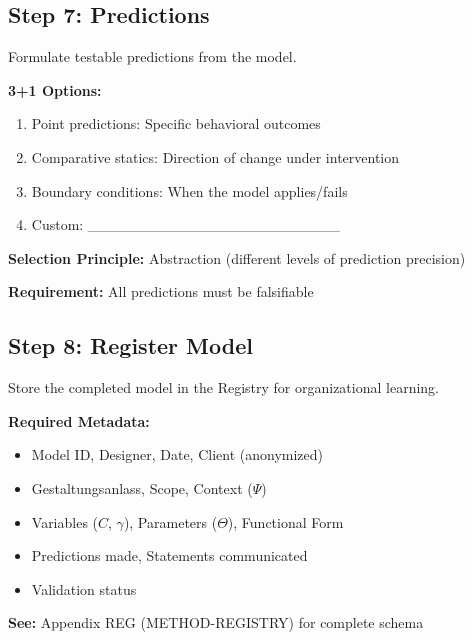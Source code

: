 \subsection{Step 7: Predictions}

Formulate testable predictions from the model.

\begin{tcolorbox}[colback=white, colframe=black,
    title=Step 7: Prediction Formulation]
\textbf{3+1 Options:}
\begin{enumerate}
\item[$\square$] Point predictions: Specific behavioral outcomes
\item[$\square$] Comparative statics: Direction of change under intervention
\item[$\square$] Boundary conditions: When the model applies/fails
\item[$\square$] Custom: \_\_\_\_\_\_\_\_\_\_\_\_\_\_\_\_\_\_\_\_\_\_\_\_
\end{enumerate}

\textbf{Selection Principle:} Abstraction (different levels of prediction precision)

\textbf{Requirement:} All predictions must be falsifiable
\end{tcolorbox}

\subsection{Step 8: Register Model}

Store the completed model in the Registry for organizational learning.

\begin{tcolorbox}[colback=white, colframe=black,
    title=Step 8: Model Registration]
\textbf{Required Metadata:}
\begin{itemize}[nosep]
\item Model ID, Designer, Date, Client (anonymized)
\item Gestaltungsanlass, Scope, Context ($\Psi$)
\item Variables ($C$, $\gamma$), Parameters ($\Theta$), Functional Form
\item Predictions made, Statements communicated
\item Validation status
\end{itemize}

\textbf{See:} Appendix REG (METHOD-REGISTRY) for complete schema
\end{tcolorbox}



